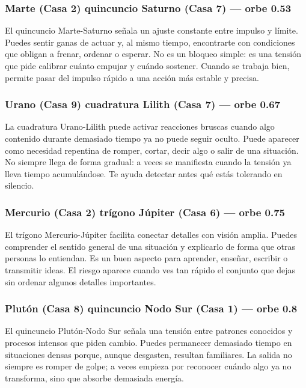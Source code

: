 \documentclass[11pt,a4paper]{article}\usepackage[utf8]{inputenc}
\begin{document}
\subsubsection*{Marte (Casa 2) quincuncio Saturno (Casa 7) --- orbe 0.53\textdegree}
El quincuncio Marte-Saturno señala un ajuste constante entre impulso y límite. Puedes sentir ganas de actuar y, al mismo tiempo, encontrarte con condiciones que obligan a frenar, ordenar o esperar. No es un bloqueo simple: es una tensión que pide calibrar cuánto empujar y cuándo sostener. Cuando se trabaja bien, permite pasar del impulso rápido a una acción más estable y precisa.

\subsubsection*{Urano (Casa 9) cuadratura Lilith (Casa 7) --- orbe 0.67\textdegree}
La cuadratura Urano-Lilith puede activar reacciones bruscas cuando algo contenido durante demasiado tiempo ya no puede seguir oculto. Puede aparecer como necesidad repentina de romper, cortar, decir algo o salir de una situación. No siempre llega de forma gradual: a veces se manifiesta cuando la tensión ya lleva tiempo acumulándose. Te ayuda detectar antes qué estás tolerando en silencio.

\subsubsection*{Mercurio (Casa 2) trígono Júpiter (Casa 6) --- orbe 0.75\textdegree}
El trígono Mercurio-Júpiter facilita conectar detalles con visión amplia. Puedes comprender el sentido general de una situación y explicarlo de forma que otras personas lo entiendan. Es un buen aspecto para aprender, enseñar, escribir o transmitir ideas. El riesgo aparece cuando ves tan rápido el conjunto que dejas sin ordenar algunos detalles importantes.

\subsubsection*{Plutón (Casa 8) quincuncio Nodo Sur (Casa 1) --- orbe 0.8\textdegree}
El quincuncio Plutón-Nodo Sur señala una tensión entre patrones conocidos y procesos intensos que piden cambio. Puedes permanecer demasiado tiempo en situaciones densas porque, aunque desgasten, resultan familiares. La salida no siempre es romper de golpe; a veces empieza por reconocer cuándo algo ya no transforma, sino que absorbe demasiada energía.
\end{document}
